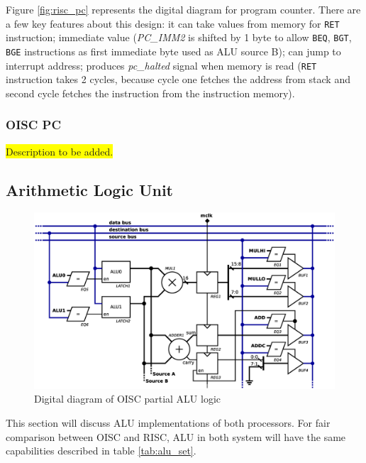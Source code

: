 Figure \ref{fig:risc_pc} represents the digital diagram for program counter. There are a few key features about this design: it can take values from memory for \texttt{RET} instruction; immediate value (\textit{PC\_IMM2} is shifted by 1 byte to allow \texttt{BEQ}, \texttt{BGT}, \texttt{BGE} instructions as first immediate byte used as ALU source B); can jump to interrupt address; produces \textit{pc\_halted} signal when memory is read (\texttt{RET} instruction takes 2 cycles, because cycle one fetches the address from stack and second cycle fetches the instruction from the instruction memory).

\subsubsection{OISC PC}

\colorbox{yellow}{Description to be added.}

\subsection{Arithmetic Logic Unit}\label{subsec:alu}

\begin{figure}[b]
\centering
\includegraphics[scale=0.35]{../resources/oisc_alu.eps}
\caption{Digital diagram of OISC partial ALU logic}
\label{fig:oisc_alu}
\end{figure}

This section will discuss ALU implementations of both processors. For fair comparison between OISC and RISC, ALU in both system will have the same capabilities described in table \ref{tab:alu_set}.

